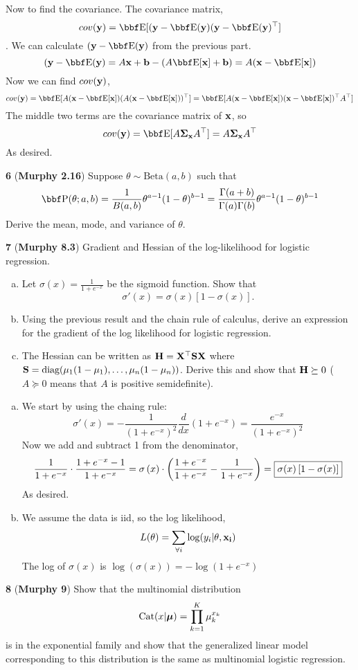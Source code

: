 \documentclass[12pt,letterpaper,fleqn]{hmcpset}
\begin{document}
Now to find the covariance. The covariance matrix,
    $$cov(\yy) = \EE[(\yy - \EE(\yy)(\yy - \EE(\yy)^\T]$$. 
We can calculate $(\yy - \EE(\yy)$ from the previous part.
    $$(\yy - \EE(\yy) = A\xx + \bb - (A\EE[\xx] + \bb) = A(\xx - \EE[\xx])$$
Now we can find $cov({\bf y})$,
    $$cov(\yy) = \EE[A(\xx - \EE[\xx])(A(\xx - \EE[\xx]))^\T] = \EE[A(\xx - \EE[\xx])(\xx - \EE[\xx])^\T A^\T]$$
The middle two terms are the covariance matrix of ${\bf x}$, so
    $$cov(\yy) = \EE[A\Sigmab_\xx A^\T] = A\Sigmab_\xx A^\T$$
As desired.


\newpage



\textbf{6} (\textbf{Murphy 2.16}) Suppose $\theta \sim \text{Beta}(a,b)$ such
that
\[
    \PP(\theta; a,b) = \frac{1}{B(a,b)} \theta^{a-1}(1-\theta)^{b-1} = \frac{\Gamma(a+b)}{\Gamma(a)\Gamma(b)} \theta^{a-1}(1-\theta)^{b-1}
\]
Derive the mean, mode, and variance of $\theta$.

\newpage

\textbf{7} (\textbf{Murphy 8.3}) Gradient and Hessian of the log-likelihood for
logistic regression.
\begin{enumerate}[(a)]
    \item Let $\sigma(x) = \frac{1}{1 + e^{-x}}$ be the sigmoid function. Show that
        \[
            \sigma'(x) = \sigma(x)\left[1 - \sigma(x)\right].
        \]
    \item Using the previous result and the chain rule of calculus, derive an
        expression for the gradient of the log likelihood for logistic regression.
    \item The Hessian can be written as ${\bf H}={\bf X}^\top{\bf S}{\bf X}$ where ${\bf S} =
        {\hbox{diag}}(\mu_1(1-\mu_1), \dots, \mu_n(1-\mu_n))$. Derive this and show that
        ${\bf H} \succeq 0$ ($A \succeq 0$ means that $A$ is positive semidefinite).
\end{enumerate}

\vspace{20mm}


\begin{solution}
	\begin{enumerate}[(a)]
		\item 
			We start by using the chaing rule:
			$$\sigma'(x) = -\frac{1}{(1+e^{-x})^2}\frac{d}{dx}(1+e^{-x}) = \frac{e^{-x}}{(1+e^{-x})^2}$$
			Now we add and subtract 1 from the denominator,
			$$\frac{1}{1 + e^{-x}} \cdot \frac{1 + e^{-x} -1}{1+e^{-x}} = \sigma \left(x\right) \cdot \left(\frac{1 + e^{-x}}{1+e^{-x}} - \frac{1}{1 + e^{-x}} \right) = \fbox{$\sigma(x)\left[1 - \sigma(x)\right]$}$$
			As desired.
		\item
			We assume the data is iid, so the log likelihood, 
			$$L(\theta) = \sum_{\forall i}\log (y_i | \theta, \bf{x}_i)$$
			The log of $\sigma (x)$ is $\log(\sigma(x)) =-\log (1 + e^{-x})$
	\end{enumerate}
\end{solution}

\textbf{8} (\textbf{Murphy 9}) Show that the multinomial distribution
\[
    \text{Cat}(x|\hbox{\boldmath$\mu$}) = \prod_{k=1}^K \mu_k^{x_k}
\]
is in the exponential family and show that the generalized linear model
corresponding to this distribution is the same as multinomial logistic
regression.
\end{document}
